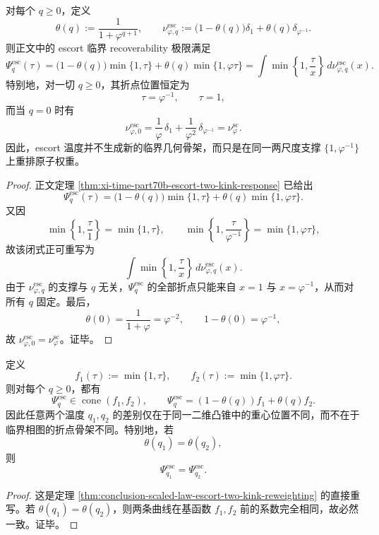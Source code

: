 \begin{theorem}\label{thm:conclusion-scaled-law-escort-two-kink-reweighting}
对每个 \(q\ge 0\)，定义
\[
\theta(q):=\frac{1}{1+\varphi^{q+1}},
\qquad
\nu_{\varphi,q}^{\mathrm{esc}}
:=
\bigl(1-\theta(q)\bigr)\delta_1+\theta(q)\delta_{\varphi^{-1}}.
\]
则正文中的 escort 临界 recoverability 极限满足
\[
\Psi_q^{\mathrm{esc}}(\tau)
=
\bigl(1-\theta(q)\bigr)\min\{1,\tau\}
+
\theta(q)\min\{1,\varphi\tau\}
=
\int \min\!\left\{1,\frac{\tau}{x}\right\}\,d\nu_{\varphi,q}^{\mathrm{esc}}(x).
\]
特别地，对一切 \(q\ge 0\)，其折点位置恒定为
\[
\tau=\varphi^{-1},
\qquad
\tau=1,
\]
而当 \(q=0\) 时有
\[
\nu_{\varphi,0}^{\mathrm{esc}}
=
\frac1\varphi\,\delta_1+\frac1{\varphi^2}\,\delta_{\varphi^{-1}}
=
\nu_\varphi^{\mathrm{sc}}.
\]
因此，escort 温度并不生成新的临界几何骨架，而只是在同一两尺度支撑 \(\{1,\varphi^{-1}\}\) 上重排原子权重。
\end{theorem}
\begin{proof}
正文定理 \ref{thm:xi-time-part70b-escort-two-kink-response} 已给出
\[
\Psi_q^{\mathrm{esc}}(\tau)
=
\bigl(1-\theta(q)\bigr)\min\{1,\tau\}
+
\theta(q)\min\{1,\varphi\tau\}.
\]
又因
\[
\min\!\left\{1,\frac{\tau}{1}\right\}=\min\{1,\tau\},
\qquad
\min\!\left\{1,\frac{\tau}{\varphi^{-1}}\right\}=\min\{1,\varphi\tau\},
\]
故该闭式正可重写为
\[
\int \min\!\left\{1,\frac{\tau}{x}\right\}\,d\nu_{\varphi,q}^{\mathrm{esc}}(x).
\]
由于 \(\nu_{\varphi,q}^{\mathrm{esc}}\) 的支撑与 \(q\) 无关，\(\Psi_q^{\mathrm{esc}}\) 的全部折点只能来自 \(x=1\) 与 \(x=\varphi^{-1}\)，从而对所有 \(q\) 固定。最后，
\[
\theta(0)=\frac{1}{1+\varphi}=\varphi^{-2},
\qquad
1-\theta(0)=\varphi^{-1},
\]
故 \(\nu_{\varphi,0}^{\mathrm{esc}}=\nu_\varphi^{\mathrm{sc}}\)。证毕。
\end{proof}

\begin{corollary}\label{cor:conclusion-scaled-law-escort-projective-weight-coordinate}
定义
\[
f_1(\tau):=\min\{1,\tau\},
\qquad
f_2(\tau):=\min\{1,\varphi\tau\}.
\]
则对每个 \(q\ge 0\)，都有
\[
\Psi_q^{\mathrm{esc}}
\in
\operatorname{cone}(f_1,f_2),
\qquad
\Psi_q^{\mathrm{esc}}=(1-\theta(q))f_1+\theta(q)f_2.
\]
因此任意两个温度 \(q_1,q_2\) 的差别仅在于同一二维凸锥中的重心位置不同，而不在于临界相图的折点骨架不同。特别地，若
\[
\theta(q_1)=\theta(q_2),
\]
则
\[
\Psi_{q_1}^{\mathrm{esc}}=\Psi_{q_2}^{\mathrm{esc}}.
\]
\end{corollary}
\begin{proof}
这是定理 \ref{thm:conclusion-scaled-law-escort-two-kink-reweighting} 的直接重写。若 \(\theta(q_1)=\theta(q_2)\)，则两条曲线在基函数 \(f_1,f_2\) 前的系数完全相同，故必然一致。证毕。
\end{proof}

